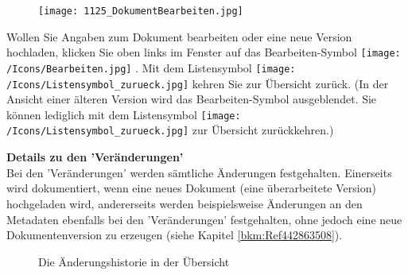 \begin{figure}
\texttt{[image: 1125\_DokumentBearbeiten.jpg]}
\end{figure}
Wollen Sie Angaben zum Dokument bearbeiten oder eine neue Version hochladen, klicken Sie oben links im Fenster auf das Bearbeiten-Symbol \texttt{[image: /Icons/Bearbeiten.jpg]} . Mit dem Listensymbol \texttt{[image: /Icons/Listensymbol\_zurueck.jpg]}  kehren Sie zur Übersicht zurück. (In der Ansicht einer älteren Version wird das Bearbeiten-Symbol ausgeblendet. Sie können lediglich mit dem Listensymbol \texttt{[image: /Icons/Listensymbol\_zurueck.jpg]} zur Übersicht zurückkehren.)

\vspace{\baselineskip}

\textbf{Details zu den 'Veränderungen'} \\
Bei den 'Veränderungen' werden sämtliche Änderungen festgehalten. Einerseits wird dokumentiert, wenn eine neues Dokument (eine überarbeitete Version) hochgeladen wird, andererseits werden beispielsweise Änderungen an den Metadaten ebenfalls bei den 'Veränderungen' festgehalten, ohne jedoch eine neue Dokumentenversion zu erzeugen (siehe Kapitel \ref{bkm:Ref442863508}).

\begin{figure}[H]
\caption{Die Änderungshistorie in der Übersicht}
\end{figure}

